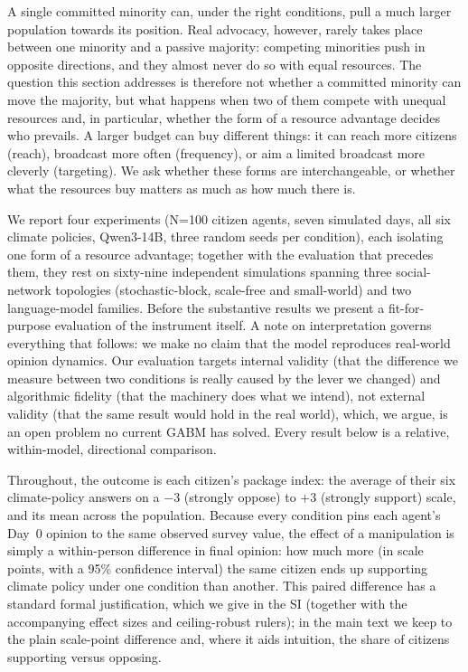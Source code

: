 \documentclass[pdflatex,sn-mathphys-num]{sn-jnl}%
\theoremstyle{thmstyleone}%
\theoremstyle{thmstyletwo}%
\theoremstyle{thmstylethree}%
\begin{document}
A single committed minority can, under the right conditions, pull a much larger
population towards its position. Real advocacy, however, rarely takes place between one
minority and a passive majority: competing minorities push in opposite directions, and
they almost never do so with equal resources. The question this section addresses is
therefore not whether a committed minority can move the majority, but what
happens when two of them compete with unequal resources and, in particular, whether
the form of a resource advantage decides who prevails. A larger budget can buy
different things: it can reach more citizens (reach), broadcast more often
(frequency), or aim a limited broadcast more cleverly (targeting). We ask
whether these forms are interchangeable, or whether what the resources buy
matters as much as how much there is.

We report four experiments (N=100 citizen agents, seven simulated days, all six
climate policies, Qwen3-14B, three random seeds per condition), each isolating one form
of a resource advantage; together with the evaluation that precedes them, they rest on
sixty-nine independent simulations spanning three social-network topologies
(stochastic-block, scale-free and small-world) and two language-model families. Before
the substantive results we present a fit-for-purpose evaluation of the instrument itself. A note on interpretation governs everything that
follows: we make no claim that the model reproduces real-world opinion dynamics. Our
evaluation targets internal validity (that the
difference we measure between two conditions is really caused by the lever we changed)
and algorithmic fidelity (that the machinery does what we intend), not external validity
(that the same result would hold in the real world), which, we argue, is an open
problem no current GABM has solved. Every result below is a relative,
within-model, directional comparison.

Throughout, the outcome is each citizen's package index: the average of their six
climate-policy answers on a $-3$ (strongly oppose) to $+3$ (strongly support) scale, and
its mean across the population. Because every condition pins each agent's Day~0 opinion
to the same observed survey value, the effect of a manipulation is simply a
within-person difference in final opinion: how much more (in scale points, with a
95\% confidence interval) the same citizen ends up supporting climate policy under one
condition than another. This paired difference has a standard formal justification,
which we give in the SI (together with the accompanying effect sizes and
ceiling-robust rulers); in the main text we keep to the plain scale-point difference
and, where it aids intuition, the share of citizens supporting versus opposing.
\end{document}
